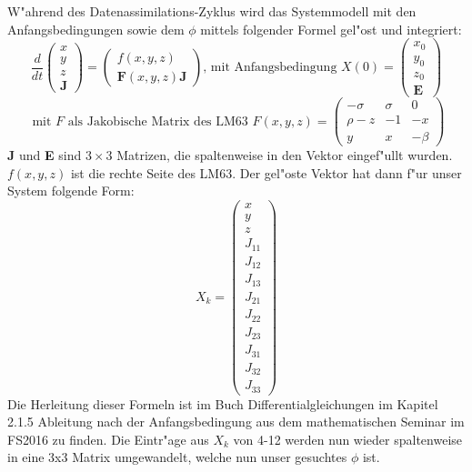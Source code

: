 \begin{refsection}
W"ahrend des Datenassimilations-Zyklus wird das Systemmodell mit den Anfangsbedingungen sowie dem $\phi$ mittels folgender Formel gel"ost und integriert:
\[
\frac{d}{dt}\begin{pmatrix}
x \\ 
y \\ 
z \\ 
\textbf{J}
\end{pmatrix}=
\begin{pmatrix}
f(x,y,z) \\ 
\textbf{F}(x,y,z)\textbf{J}
\end{pmatrix} 
\text{, mit Anfangsbedingung }
X(0)=\begin{pmatrix}
x_{0}\\
y_{0}\\
z_{0}\\ 
\textbf{E}
\end{pmatrix} 
\]
\[
\text{ mit $F$ als Jakobische Matrix des LM63 }F(x,y,z) = \begin{pmatrix}
-\sigma & \sigma & 0 \\ 
\rho-z & -1 & -x \\ 
y & x & -\beta
\end{pmatrix} 
\]
\textbf{J} und \textbf{E} sind $3\times3$ Matrizen, die spaltenweise in den Vektor eingef"ullt wurden. $f(x,y,z)$ ist die rechte Seite des LM63. Der gel"oste Vektor hat dann f"ur unser System folgende Form:
\[
X_{k}=\begin{pmatrix}
x \\ 
y \\ 
z \\  
J_{11} \\ 
J_{12} \\ 
J_{13} \\ 
J_{21} \\ 
J_{22} \\ 
J_{23} \\ 
J_{31} \\ 
J_{32} \\
J_{33} 
\end{pmatrix}
\]
Die Herleitung dieser Formeln ist im Buch Differentialgleichungen im Kapitel 2.1.5 Ableitung nach der Anfangsbedingung aus dem mathematischen Seminar im FS2016 zu finden. Die Eintr"age aus $X_{k}$ von 4-12 werden nun wieder spaltenweise in eine 3x3 Matrix umgewandelt, welche nun unser gesuchtes $\phi$ ist.\\


\end{refsection}
